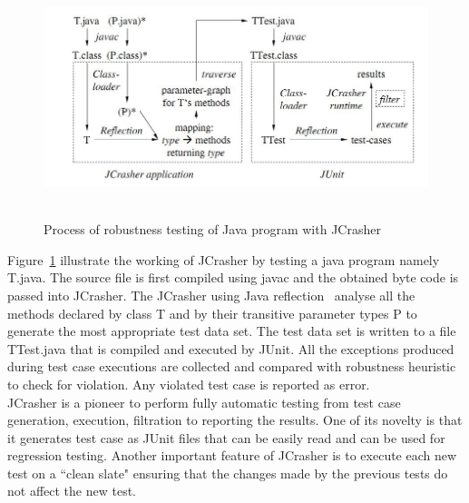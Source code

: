 \begin{figure}[h]
	\centering
	\includegraphics[width=15cm, height=7cm]{Literature/JCrasher.png}
	\caption{Process of robustness testing of Java program with JCrasher~\cite{Pacheco2007b}}
	\label{fig:JCrasher}
\end{figure}

Figure~\ref{fig:JCrasher} illustrate the working of JCrasher by testing a java program namely T.java. The source file is first compiled using javac and the obtained byte code is passed into JCrasher. The JCrasher using Java reflection~\cite{chan1999java}  analyse all the methods declared by class T and by their transitive parameter types P to generate the most appropriate test data set. The test data set is written to a file TTest.java that is compiled and executed by JUnit. All the exceptions produced during test case executions are collected and compared with robustness heuristic to check for violation. Any violated test case is reported as error.\\

JCrasher is a pioneer to perform fully automatic testing from test case generation, execution, filtration to reporting the results. One of its novelty  is that it generates test case as JUnit files that can be easily read and can be used for regression testing. Another important feature of JCrasher is to execute each new test on a ``clean slate" ensuring that the changes made by the previous tests do not affect the new test.  



